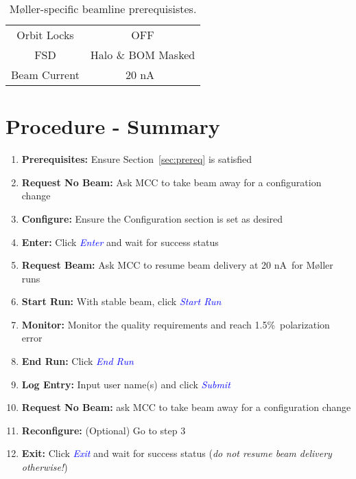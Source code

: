 \documentclass[amsmath,amssymb,notitlepage,12pt]{revtex4}
\newcommand{\ibeam}{20 nA\ }
\newcommand{\easy}{1.5\%}
\begin{document}
\begin{table}[htbp]\centering
    \begin{tabular}{c|c}\toprule[1.5pt]
        Orbit Locks & OFF\\
        FSD & Halo \& BOM Masked\\
        Beam Current & \ibeam \\
        \bottomrule[1.5pt]
    \end{tabular}
    \caption{M{\o}ller-specific beamline prerequisistes.}
\end{table}

\newpage
\section{Procedure - Summary}\label{sec:procedure}
\begin{enumerate}
\vspace{-2mm}\item {\bf Prerequisites:}  Ensure Section~\ref{sec:prereq} is satisfied
\vspace{-4mm}\item {\bf Request No Beam:}  Ask MCC to take beam away for a configuration change
\vspace{-4mm}\item {\bf Configure:}  Ensure the Configuration section is set as desired
\vspace{-4mm}\item {\bf Enter:} Click \textcolor{blue}{\em Enter} and wait for success status
\vspace{-4mm}\item {\bf Request Beam:} Ask MCC to resume beam delivery at \ibeam for M{\o}ller runs
\vspace{-4mm}\item {\bf Start Run:} With stable beam, click \textcolor{blue}{\em Start Run}
\vspace{-4mm}\item {\bf Monitor:} Monitor the quality requirements and reach \easy\ polarization error
\vspace{-4mm}\item {\bf End Run:} Click \textcolor{blue}{\em End Run}
\vspace{-4mm}\item {\bf Log Entry:} Input user name(s) and click \textcolor{blue}{\em Submit}
\vspace{-4mm}\item {\bf Request No Beam:} ask MCC to take beam away for a configuration change
\vspace{-4mm}\item {\bf Reconfigure:} (Optional) Go to step 3
\vspace{-4mm}\item {\bf Exit:} Click \textcolor{blue}{\em Exit} and wait for success status ({\em do not resume beam delivery otherwise!})
\end{enumerate}
\end{document}
